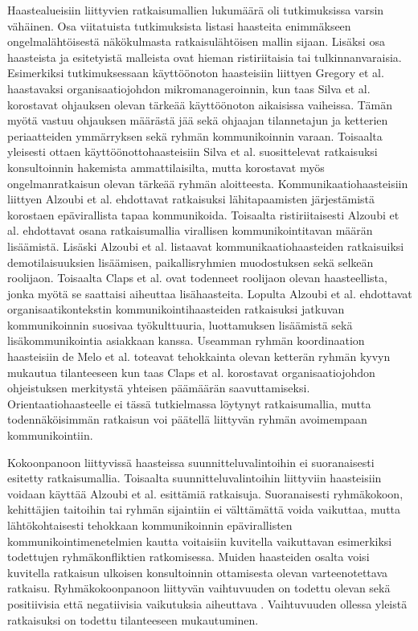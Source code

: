 Haastealueisiin liittyvien ratkaisumallien lukumäärä oli tutkimuksissa varsin vähäinen. Osa viitatuista tutkimuksista listasi haasteita enimmäkseen ongelmalähtöisestä näkökulmasta ratkaisulähtöisen mallin sijaan. Lisäksi osa haasteista ja esitetyistä malleista ovat hieman ristiriitaisia tai tulkinnanvaraisia. Esimerkiksi tutkimuksessaan käyttöönoton haasteisiin liittyen Gregory et al. \cite{GREGORY201692} haastavaksi organisaatiojohdon mikromanageroinnin, kun taas Silva et al. \cite{SELLERISILVA201520} korostavat ohjauksen olevan tärkeää käyttöönoton aikaisissa vaiheissa. Tämän myötä vastuu ohjauksen määrästä jää sekä ohjaajan tilannetajun ja ketterien periaatteiden ymmärryksen sekä ryhmän kommunikoinnin varaan. Toisaalta yleisesti ottaen käyttöönottohaasteisiin Silva et al. suosittelevat ratkaisuksi konsultoinnin hakemista ammattilaisilta, mutta korostavat myös ongelmanratkaisun olevan tärkeää ryhmän aloitteesta. Kommunikaatiohaasteisiin liittyen Alzoubi et al. \cite{ALZOUBI201622} ehdottavat ratkaisuksi lähitapaamisten järjestämistä korostaen epävirallista tapaa kommunikoida. Toisaalta ristiriitaisesti Alzoubi et al. ehdottavat osana ratkaisumallia virallisen kommunikointitavan määrän lisäämistä. Lisäski Alzoubi et al. listaavat kommunikaatiohaasteiden ratkaisuiksi demotilaisuuksien lisäämisen, paikallisryhmien muodostuksen sekä selkeän roolijaon. Toisaalta Claps et al. \cite{CLAPS201521} ovat todenneet roolijaon olevan haasteellista, jonka myötä se saattaisi aiheuttaa lisähaasteita. Lopulta Alzoubi et al. \cite{ALZOUBI201622} ehdottavat organisaatikontekstin kommunikointihaasteiden ratkaisuksi jatkuvan kommunikoinnin suosivaa työkulttuuria, luottamuksen lisäämistä sekä lisäkommunikointia asiakkaan kanssa. Useamman ryhmän koordinaation haasteisiin de Melo et al. \cite{DEOMELO2013412} toteavat tehokkainta olevan ketterän ryhmän kyvyn mukautua tilanteeseen kun taas Claps et al. \cite{CLAPS201521} korostavat organisaatiojohdon ohjeistuksen merkitystä yhteisen päämäärän saavuttamiseksi. Orientaatiohaasteelle ei tässä tutkielmassa löytynyt ratkaisumallia, mutta todennäköisimmän ratkaisun voi päätellä liittyvän ryhmän avoimempaan kommunikointiin.

Kokoonpanoon liittyvissä haasteissa suunnitteluvalintoihin ei suoranaisesti esitetty ratkaisumallia. Toisaalta suunnitteluvalintoihin liittyviin haasteisiin voidaan käyttää Alzoubi et al. \cite{ALZOUBI201622} esittämiä ratkaisuja. Suoranaisesti ryhmäkokoon, kehittäjien taitoihin tai ryhmän sijaintiin ei välttämättä voida vaikuttaa, mutta lähtökohtaisesti tehokkaan kommunikoinnin epävirallisten kommunikointimenetelmien kautta voitaisiin kuvitella vaikuttavan esimerkiksi todettujen ryhmäkonfliktien ratkomisessa. Muiden haasteiden osalta voisi kuvitella \cite{SELLERISILVA201520} ratkaisun ulkoisen konsultoinnin ottamisesta olevan varteenotettava ratkaisu. Ryhmäkokoonpanoon liittyvän vaihtuvuuden on todettu olevan sekä positiivisia että negatiivisia vaikutuksia aiheuttava \cite{DEOMELO2013412}. Vaihtuvuuden ollessa yleistä ratkaisuksi on todettu tilanteeseen mukautuminen.

